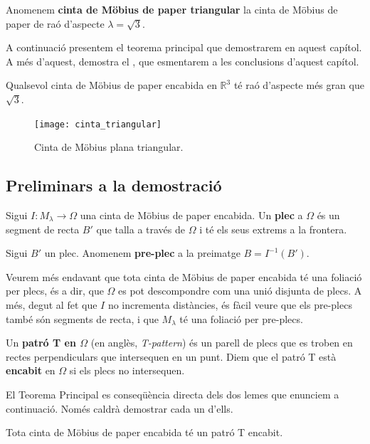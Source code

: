 \begin{ex}
    Anomenem \textbf{cinta de Möbius de paper triangular} la cinta de Möbius de paper de raó d'aspecte $\lambda = \sqrt{3}$.
\end{ex}




A continuació presentem el teorema principal que demostrarem en aquest capítol. A més d'aquest, \cite{schwartz2024} demostra el , que esmentarem a les conclusions d'aquest capítol. 
\begin{teo}\label{teo:Main Schwartz}
    Qualsevol cinta de Möbius de paper encabida en $\mathbb R^3$ té raó d'aspecte més gran que $\sqrt{3}$.
\end{teo}

\begin{figure}[htbp]
    \centering
    \texttt{[image: cinta\_triangular]}
    \caption{Cinta de Möbius plana triangular.}
    \label{fig:mobius_triangular}
\end{figure}


\subsection{Preliminars a la demostració}
\begin{defi}
    Sigui $I:M_\lambda\to\Omega$ una cinta de Möbius de paper encabida. Un \textbf{plec} a $\Omega$ és un segment de recta $B'$ que talla a través de $\Omega$ i té els seus extrems a la frontera.
\end{defi}

\begin{defi}
    Sigui $B'$ un plec. Anomenem \textbf{pre-plec} a la preimatge $B=I^{-1}(B')$.
\end{defi}
Veurem més endavant que tota cinta de Möbius de paper encabida té una foliació per plecs, és a dir, que $\Omega$ es pot descompondre com una unió disjunta de plecs. A més, degut al fet que $I$ no incrementa distàncies, és fàcil veure que els pre-plecs també són segments de recta, i que $M_\lambda$ té una foliació per pre-plecs.
\begin{defi}
    Un \textbf{patró T en $\Omega$} (en anglès, \textit{T-pattern}) és un parell de plecs que es troben en rectes perpendiculars que intersequen en un punt. Diem que el patró T està \textbf{encabit} en $\Omega$ si els plecs no intersequen.
\end{defi}

El Teorema Principal es conseqüència directa dels dos lemes que enunciem a continuació. Només caldrà demostrar cada un d'ells.
\begin{lema}[\textbf{T}]\label{lema T}
    Tota cinta de Möbius de paper encabida té un patró T encabit.
\end{lema}

